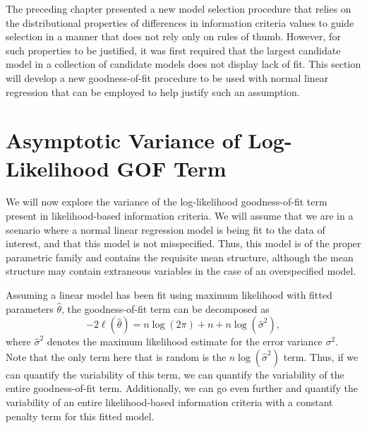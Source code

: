 \doublespace
{}

	The preceding chapter presented a new model selection procedure that relies on the distributional properties of differences in information criteria values to guide
	selection in a manner that does not rely only on rules of thumb. However, for such properties to be justified, it was first required that the largest candidate model
	in a collection of candidate models does not display lack of fit. This section will develop a new goodness-of-fit procedure to be used with normal linear regression
	that can be employed to help justify such an assumption.
		
		\section{Asymptotic Variance of Log-Likelihood GOF Term} \label{sec:asymp_var}

		We will now explore the variance of the log-likelihood goodness-of-fit term present in likelihood-based information criteria. We will assume that we are in a
		scenario where a normal linear regression model is being fit to the data of interest, and that this model is not misspecified. Thus, this model is of the proper
		parametric family and contains the requisite mean structure, although the mean structure may contain extraneous variables in the
		case of an overspecified model.

		Assuming a linear model has been fit using maximum likelihood with fitted parameters $\hat{\theta}$, the goodness-of-fit term can be decomposed as
		\begin{equation}
			-2 \ell (\hat{\theta}  ) = n \log(2 \pi) + n + n \log(\hat{\sigma}^2 ) ,
		\end{equation}
		where $\hat{\sigma}^2$ denotes the maximum likelihood estimate for the error variance $\sigma^2$. Note that the only term here that is random is
		the $n \log(\hat{\sigma}^2)$ term. Thus, if we can quantify the variability of this term, we can quantify the variability of the entire goodness-of-fit
		term. Additionally, we can go even further and quantify the variability of an entire likelihood-based information criteria with a constant penalty
		term for this fitted model.

